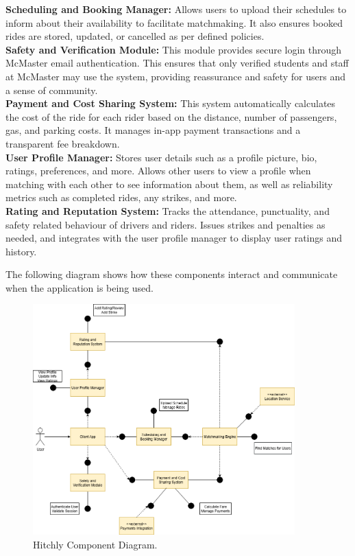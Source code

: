 \documentclass[12pt,letterpaper]{article}
\begin{document}
\noindent \textbf{Scheduling and Booking Manager:} Allows users to upload their schedules to inform about their availability to facilitate matchmaking. It also ensures booked rides are stored, updated, or cancelled as per defined policies.  \\

\noindent \textbf{Safety and Verification Module:} This module provides secure login through McMaster email authentication. This ensures that only verified students and staff at McMaster may use the system, providing reassurance and safety for users and a sense of community. \\

\noindent \textbf{Payment and Cost Sharing System:} This system automatically calculates the cost of the ride for each rider based on the distance, number of passengers, gas, and parking costs. It manages in-app payment transactions and a transparent fee breakdown. \\

\noindent \textbf{User Profile Manager:} Stores user details such as a profile picture, bio, ratings, preferences, and more. Allows other users to view a profile when matching with each other to see information about them, as well as reliability metrics such as completed rides, any strikes, and more. \\

\noindent \textbf{Rating and Reputation System:} Tracks the attendance, punctuality, and safety related behaviour of drivers and riders. Issues strikes and penalties as needed, and integrates with the user profile manager to display user ratings and history. \\
\vspace{1em}

\begin{samepage}
\noindent The following diagram shows how these components interact and communicate when the application is being used.
\begin{figure}[!h]
  \centering
  \includegraphics[width=0.9\textwidth]{component_diagram.png}
  \caption{Hitchly Component Diagram.}
\end{figure}
\end{samepage}
\clearpage
\end{document}
